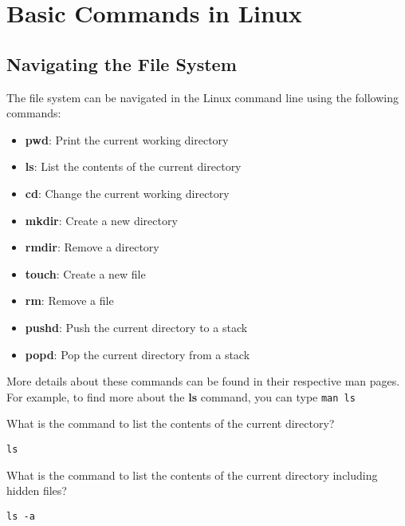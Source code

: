\setchapterpreamble[u]{\margintoc}
\chapter{Basic Commands in Linux}

\section{Navigating the File System}
The file system can be navigated in the Linux command line using the following commands:
\begin{itemize}
  \item \textbf{pwd}: Print the current working directory
  \item \textbf{ls}: List the contents of the current directory
  \item \textbf{cd}: Change the current working directory
  \item \textbf{mkdir}: Create a new directory
  \item \textbf{rmdir}: Remove a directory
  \item \textbf{touch}: Create a new file
  \item \textbf{rm}: Remove a file
  \item \textbf{pushd}: Push the current directory to a stack
  \item \textbf{popd}: Pop the current directory from a stack
\end{itemize}

More details about these commands can be found in their respective
man pages. For example, to find more about the \textbf{ls} command,
you can type \texttt{man ls}

\begin{qs}
  What is the command to list the contents of the current directory?
\end{qs}

\begin{ans}
  \texttt{ls}
\end{ans}


\begin{qs}
  What is the command to list the contents of the current directory
  including hidden files?
\end{qs}

\begin{ans}
\texttt{ls -a}
\end{ans}

